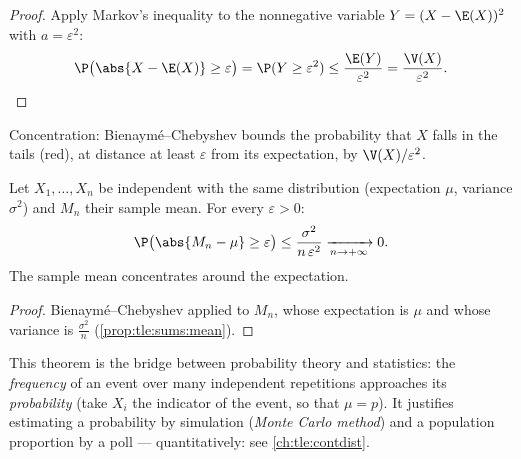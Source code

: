 \begin{proof}
Apply Markov's inequality to the nonnegative variable
$Y = (X - \E(X))^2$ with $a = \varepsilon^2$:
\[
\P\bigl(\abs{X - \E(X)} \geq \varepsilon\bigr)
= \P(Y \geq \varepsilon^2)
\leq \frac{\E(Y)}{\varepsilon^2} = \frac{\V(X)}{\varepsilon^2}. \qedhere
\]
\end{proof}

\begin{omfigure}

{\small Concentration: Bienaymé--Chebyshev bounds the probability that
$X$ falls in the tails (red), at distance at least $\varepsilon$ from
its expectation, by $\V(X)/\varepsilon^2$.}
\end{omfigure}

\begin{theorem}\label{thm:tle:sums:lln}
Let $X_1, \dots, X_n$ be independent with the same distribution
(expectation $\mu$, variance $\sigma^2$) and $M_n$ their sample mean. For
every $\varepsilon > 0$:
\[
\P\bigl(\abs{M_n - \mu} \geq \varepsilon\bigr)
\leq \frac{\sigma^2}{n\,\varepsilon^2}
\xrightarrow[n \to +\infty]{} 0 .
\]
The sample mean concentrates around the expectation.
\end{theorem}

\begin{proof}
Bienaymé--Chebyshev applied to $M_n$, whose expectation is $\mu$ and whose
variance is $\frac{\sigma^2}{n}$ (\cref{prop:tle:sums:mean}).
\end{proof}

\begin{remark}
This theorem is the bridge between probability theory and statistics: the
\emph{frequency} of an event over many independent repetitions approaches
its \emph{probability} (take $X_i$ the indicator of the event, so that
$\mu = p$). It justifies estimating a probability by simulation
(\emph{Monte Carlo method}) and a population proportion by a poll ---
quantitatively: see \cref{ch:tle:contdist}.
\end{remark}


